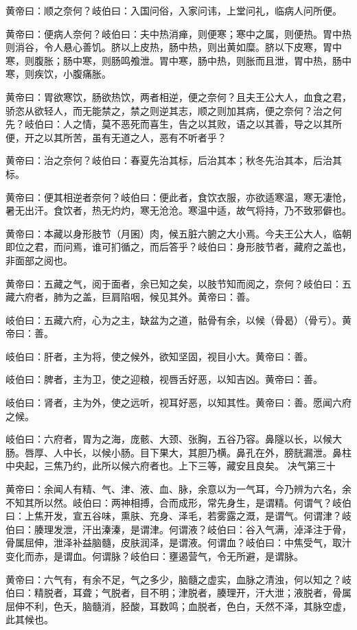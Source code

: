\documentclass[a4paper,12pt,UTF8,twoside]{ctexbook}
\begin{document}
	黄帝曰：顺之奈何？岐伯曰：入国问俗，入家问讳，上堂问礼，临病人问所便。
	
	黄帝曰：便病人奈何？岐伯曰：夫中热消瘅，则便寒；寒中之属，则便热。胃中热则消谷，令人悬心善饥。脐以上皮热，肠中热，则出黄如糜。脐以下皮寒，胃中寒，则腹胀；肠中寒，则肠鸣飧泄。胃中寒，肠中热，则胀而且泄，胃中热，肠中寒，则疾饮，小腹痛胀。
	
	黄帝曰：胃欲寒饮，肠欲热饮，两者相逆，便之奈何？且夫王公大人，血食之君，骄恣从欲轻人，而无能禁之，禁之则逆其志，顺之则加其病，便之奈何？治之何先？岐伯曰：人之情，莫不恶死而喜生，告之以其败，语之以其善，导之以其所便，开之以其所苦，虽有无道之人，恶有不听者乎？
	
	黄帝曰：治之奈何？岐伯曰：春夏先治其标，后治其本；秋冬先治其本，后治其标。
	
	黄帝曰：便其相逆者奈何？岐伯曰：便此者，食饮衣服，亦欲适寒温，寒无凄怆，暑无出汗。食饮者，热无灼灼，寒无沧沧。寒温中适，故气将持，乃不致邪僻也。
	
	黄帝曰：本藏以身形肢节（月囷）肉，候五脏六腑之大小焉。今夫王公大人，临朝即位之君，而问焉，谁可扪循之，而后答乎？岐伯曰：身形肢节者，藏府之盖也，非面部之阅也。
	
	黄帝曰：五藏之气，阅于面者，余已知之矣，以肢节知而阅之，奈何？岐伯曰：五藏六府者，肺为之盖，巨肩陷咽，候见其外。黄帝曰：善。
	
	岐伯曰：五藏六府，心为之主，缺盆为之道，骷骨有余，以候（骨曷）（骨亏）。黄帝曰：善。
	
	岐伯曰：肝者，主为将，使之候外，欲知坚固，视目小大。黄帝曰：善。
	
	岐伯曰：脾者，主为卫，使之迎粮，视唇舌好恶，以知吉凶。黄帝曰：善。
	
	岐伯曰：肾者，主为外，使之远听，视耳好恶，以知其性。黄帝曰：善。愿闻六府之候。
	
	岐伯曰：六府者，胃为之海，庞骸、大颈、张胸，五谷乃容。鼻隧以长，以候大肠。唇厚、人中长，以候小肠。目下果大，其胆乃横。鼻孔在外，膀胱漏泄。鼻柱中央起，三焦乃约，此所以候六府者也。上下三等，藏安且良矣。
	决气第三十
	
	黄帝曰：余闻人有精、气、津、液、血、脉，余意以为一气耳，今乃辨为六名，余不知其所以然。岐伯曰：两神相搏，合而成形，常先身生，是谓精。何谓气？岐伯曰：上焦开发，宣五谷味，熏肤、充身、泽毛，若雾露之溉，是谓气。何谓津？岐伯曰：腠理发泄，汗出溱溱，是谓津。何谓液？岐伯曰：谷入气满，淖泽注于骨，骨属屈伸，泄泽补益脑髓，皮肤润泽，是谓液。何谓血？岐伯曰：中焦受气，取汁变化而赤，是谓血。何谓脉？岐伯曰：壅遏营气，令无所避，是谓脉。
	
	黄帝曰：六气有，有余不足，气之多少，脑髓之虚实，血脉之清浊，何以知之？岐伯曰：精脱者，耳聋；气脱者，目不明；津脱者，腠理开，汗大泄；液脱者，骨属屈伸不利，色夭，脑髓消，胫酸，耳数鸣；血脱者，色白，夭然不泽，其脉空虚，此其候也。
	
\end{document}
